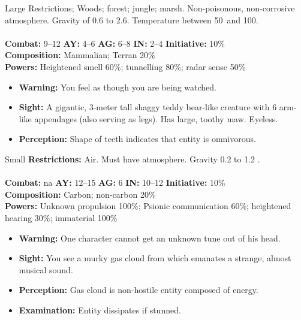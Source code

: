 \hrulefill

\begin{creature}{Large}
Restrictions; Woods; forest; jungle; marsh. Non-poisonous, non-corrosive atmosphere. Gravity of 0.6 to 2.6. Temperature between 
50\textdegree\ and 100\textdegree. \\\\
\textbf{Combat:} 9--12 \textbf{AY:} 4--6 \textbf{AG:} 6--8 \textbf{IN:} 2--4 \textbf{Initiative:} 10\% \\
\textbf{Composition:} Mammalian; Terran 20\% \\
\textbf{Powers:} Heightened smell 60\%; tunnelling 80\%; radar sense 50\% 
\begin{itemize}
\item \textbf{Warning:} You feel as though you are being watched. 
\item \textbf{Sight:} A gigantic, 3-meter tall shaggy teddy bear-like creature with 6 arm-like appendages (also serving as legs). Has large, toothy 
maw. Eyeless. 
\item \textbf{Perception:} Shape of teeth indicates that entity is omnivorous. 
\end{itemize}
\end{creature}

\hrulefill

\begin{creature}{Small}
\textbf{Restrictions:} Air. Must have atmosphere. Gravity 0.2 to 1.2 . \\\\
\textbf{Combat:} na \textbf{AY:} 12--15 \textbf{AG:} 6 \textbf{IN:} 10--12 \textbf{Initiative:} 10\% \\
\textbf{Composition:} Carbon; non-carbon 20\% \\
\textbf{Powers:} Unknown propulsion 100\%; Psionic communication 60\%; heightened hearing 30\%; immaterial 100\% 
\begin{itemize}
\item \textbf{Warning:} One character cannot get an unknown tune out of his head. 
\item \textbf{Sight:} You see a murky gas cloud from which emanates a strange, almost musical sound. 
\item \textbf{Perception:} Gas cloud is non-hostile entity composed of energy. 
\item \textbf{Examination:} Entity dissipates if stunned. 
\end{itemize}
\end{creature}

